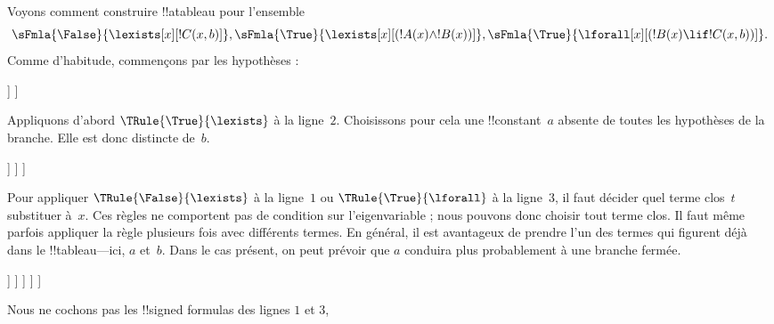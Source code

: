 \documentclass[../../../include/open-logic-section]{subfiles}
\begin{document}
\begin{ex}
Voyons comment construire !!a{tableau} pour l'ensemble
\[
\sFmla{\False}{\lexists[x][!C(x,b)]},
\sFmla{\True}{\lexists[x][(!A(x) \land !B(x))]},
\sFmla{\True}{\lforall[x][(!B(x) \lif !C(x,b))]}.
\]
Comme d'habitude, commençons par les hypothèses :
\begin{oltableau}
  [\sFmla{\False}{\lexists[x][\formula{C}(x,b)]}, just=\TAss
    [\sFmla{\True}{\lexists[x][(\formula{A}(x) \land \formula{B}(x))]},
      just=\TAss
      [\sFmla{\True}{\lforall[x][(\formula{B}(x) \lif \formula{C}(x,b))]},
        just=\TAss]
    ]
  ]
\end{oltableau}
Appliquons d'abord $\TRule{\True}{\lexists}$ à la ligne~$2$.
Choisissons pour cela une !!{constant}~$a$ absente de toutes les
hypothèses de la branche. Elle est donc distincte de~$b$.
%
\begin{oltableau}
  [\sFmla{\False}{\lexists[x][\formula{C}(x,b)]}, just=\TAss
    [\sFmla{\True}{\lexists[x][(\formula{A}(x) \land \formula{B}(x))]},
      just=\TAss, checked
      [\sFmla{\True}{\lforall[x][(\formula{B}(x) \lif \formula{C}(x,b))]},
        just=\TAss
        [\sFmla{\True}{\formula{A}(a) \land \formula{B}(a)},
          just={\TRule{\True}{\lexists}[2]}]
      ]
    ]
  ]
\end{oltableau}
Pour appliquer $\TRule{\False}{\lexists}$ à la ligne~$1$ ou
$\TRule{\True}{\lforall}$ à la ligne~$3$, il faut décider quel terme
clos~$t$ substituer à~$x$. Ces règles ne comportent pas de condition sur
l'eigenvariable ; nous pouvons donc choisir tout terme clos. Il faut
même parfois appliquer la règle plusieurs fois avec différents termes.
En général, il est avantageux de prendre l'un des termes qui figurent
déjà dans le !!{tableau}---ici, $a$ et~$b$. Dans le cas présent, on peut
prévoir que $a$ conduira plus probablement à une branche fermée.
\begin{oltableau}
  [\sFmla{\False}{\lexists[x][\formula{C}(x,b)]}, just=\TAss
    [\sFmla{\True}{\lexists[x][(\formula{A}(x) \land \formula{B}(x))]},
      just=\TAss, checked
      [\sFmla{\True}{\lforall[x][(\formula{B}(x) \lif \formula{C}(x,b))]}, just=\TAss
        [\sFmla{\True}{\formula{A}(a) \land \formula{B}(a)}, just={\TRule{\True}{\lexists}[2]}
          [\sFmla{\False}{\formula{C}(a,b)}, just={\TRule{\False}{\lexists}[1]}
            [\sFmla{\True}{\formula{B}(a) \lif \formula{C}(a,b)},
              just={\TRule{\True}{\lforall}[3]}
            ]
          ]
        ]
      ]
    ]
  ]
\end{oltableau}
Nous ne cochons pas les !!{signed formula}s des lignes $1$ et $3$,

\end{ex}
\end{document}

